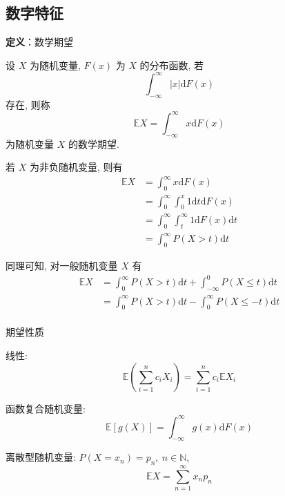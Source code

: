 \documentclass[openany]{ctexbook}
\theoremstyle{kaiti}
\theoremstyle{normal}
\begin{document}
\subsection{数字特征}

\textbf{定义}：数学期望

设 $X$ 为随机变量, $F(x)$ 为 $X$ 的分布函数, 若
\begin{equation}
  \int_{-\infty}^\infty |x|\mathrm{d}F(x)
\end{equation}
 存在, 则称
\begin{equation}
  \mathbb{E}X=\int_{-\infty}^\infty x\mathrm{d}F(x)
\end{equation}
 为随机变量 $X$ 的数学期望.

若 $X$ 为非负随机变量, 则有
\begin{equation}
  \begin{aligned}
    \mathbb{E}X
    &=\int_{0}^\infty x\mathrm{d}F(x)\\
    &=\int_{0}^\infty\int_0^x1\mathrm{d}t\mathrm{d}F(x)\\
    &=\int_{0}^\infty\int_t^\infty1\mathrm{d}F(x)\mathrm{d}t\\
    &=\int_0^\infty P(X>t)\mathrm{d}t
  \end{aligned}
\end{equation}

同理可知, 对一般随机变量 $X$ 有
\begin{equation}
  \begin{aligned}
    \mathbb{E}X
    &=\int_0^\infty P(X>t)\mathrm{d}t+\int_{-\infty}^0P(X\leqslant t)\mathrm{d}t\\
    &=\int_0^\infty P(X>t)\mathrm{d}t-\int_0^\infty P(X\leqslant -t)\mathrm{d}t\\
  \end{aligned}
\end{equation}

期望性质

线性:
\begin{equation}
  \mathbb{E}\left(\sum_{i=1}^nc_iX_i\right)=\sum_{i=1}^nc_i\mathbb{E}X_i
\end{equation}


函数复合随机变量:
\begin{equation}
  \mathbb{E}[g(X)]=\int_{-\infty}^\infty g(x)\mathrm{d}F(x)
\end{equation}


离散型随机变量: $P(X=x_n)=p_n,~n\in\mathbb{N}$,
\begin{equation}
  \mathbb{E}X=\sum_{n=1}^\infty x_np_n
\end{equation}
\end{document}
